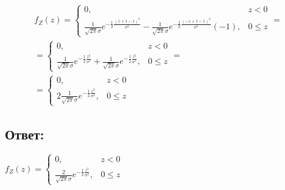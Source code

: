 \begin{multline}
    f_Z(z)
    = \left \{
    \begin{array}{ll}
        0,                                                                                                                                                                                                & z < 0    \\
        \frac{1}{\sqrt{2 \pi} \sigma} e^{-\frac{1}{2} \frac{\left ( z + 1 - 1 \right )^2}{\sigma^2}} - \frac{1}{\sqrt{2 \pi} \sigma} e^{-\frac{1}{2} \frac{\left ( -z + 1 - 1 \right )^2}{\sigma^2}}(-1), & 0 \leq z
    \end{array}
    \right . = \\
    = \left \{
    \begin{array}{ll}
        0,                                                                                                                                         & z < 0    \\
        \frac{1}{\sqrt{2 \pi} \sigma} e^{-\frac{1}{2} \frac{z^2}{\sigma^2}} + \frac{1}{\sqrt{2 \pi} \sigma} e^{-\frac{1}{2} \frac{z^2}{\sigma^2}}, & 0 \leq z
    \end{array}
    \right . = \\
    = \left \{
    \begin{array}{ll}
        0,                                                                     & z < 0    \\
        2 \frac{1}{\sqrt{2 \pi} \sigma} e^{-\frac{1}{2} \frac{z^2}{\sigma^2}}, & 0 \leq z
    \end{array}
    \right .
\end{multline}

\subsection*{Ответ:}
$
f_Z(z)
= \left \{
\begin{array}{ll}
    0,                                                                   & z < 0    \\
    \frac{2}{\sqrt{2 \pi} \sigma} e^{-\frac{1}{2} \frac{z^2}{\sigma^2}}, & 0 \leq z
\end{array}
\right .
$


